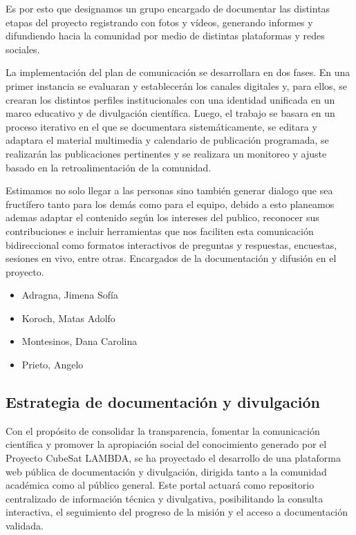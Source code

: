 \begin{itemize}
          Es por esto que designamos un grupo encargado de documentar las distintas etapas
          del proyecto registrando con fotos y vídeos, generando informes y difundiendo hacia la
          comunidad por medio de distintas plataformas y redes sociales.

          La implementación del plan de comunicación se desarrollara en dos fases. En una primer
          instancia se evaluaran y establecerán los canales digitales y, para ellos, se crearan los
          distintos perfiles institucionales con una identidad unificada en un marco educativo
          y de divulgación científica. Luego, el trabajo se basara en un proceso iterativo en el
          que se documentara sistemáticamente, se editara y adaptara el material multimedia y
          calendario de publicación programada, se realizarán las publicaciones pertinentes y se
          realizara un monitoreo y ajuste basado en la retroalimentación de la comunidad.

          Estimamos no solo llegar a las personas sino también generar dialogo que sea fructífero
          tanto para los demás como para el equipo, debido a esto planeamos ademas adaptar el
          contenido según los intereses del publico, reconocer sus contribuciones e incluir
          herramientas que nos faciliten esta comunicación bidireccional como formatos interactivos
          de preguntas y respuestas, encuestas, sesiones en vivo, entre otras.
          Encargados de la documentación y difusión en el proyecto.
          \begin{itemize}
            \item Adragna, Jimena Sofía
            \item Koroch, Matas Adolfo
            \item Montesinos, Dana Carolina
            \item Prieto, Angelo
          \end{itemize}
      \end{itemize}

  \subsection{Estrategia de documentación y divulgación}

    Con el propósito de consolidar la transparencia, fomentar la comunicación científica y
    promover la apropiación social del conocimiento generado por el Proyecto CubeSat LAMBDA, se ha
    proyectado el desarrollo de una plataforma web pública de documentación y divulgación, dirigida
    tanto a la comunidad académica como al público general. Este portal actuará como repositorio
    centralizado de información técnica y divulgativa, posibilitando la consulta interactiva, el
    seguimiento del progreso de la misión y el acceso a documentación validada.

